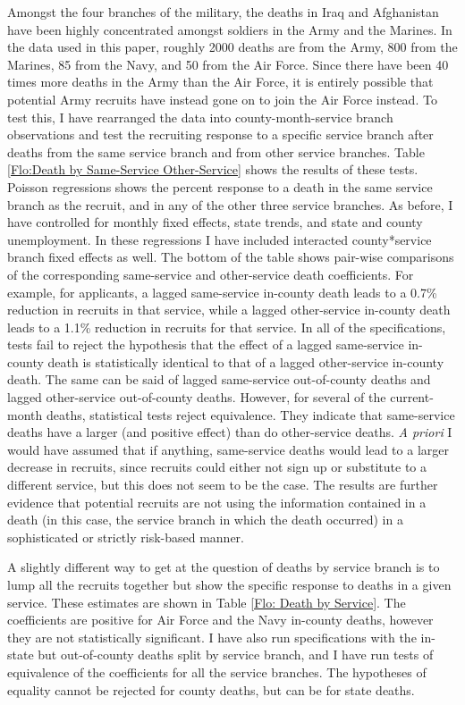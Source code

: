 \documentclass[12pt] {article}
\begin{document}
Amongst the four branches of the military, the deaths in Iraq and
Afghanistan have been highly concentrated amongst soldiers in the
Army and the Marines. In the data used in this paper, roughly 2000
deaths are from the Army, 800 from the Marines, 85 from the Navy,
and 50 from the Air Force. Since there have been 40 times more deaths
in the Army than the Air Force, it is entirely possible that potential
Army recruits have instead gone on to join the Air Force instead.
To test this, I have rearranged the data into county-month-service
branch observations and test the recruiting response to a specific
service branch after deaths from the same service branch and from
other service branches. Table \ref{Flo:Death by Same-Service Other-Service}
shows the results of these tests. Poisson regressions shows the percent
response to a death in the same service branch as the recruit, and
in any of the other three service branches. As before, I have controlled
for monthly fixed effects, state trends, and state and county unemployment.
In these regressions I have included interacted county{*}service branch
fixed effects as well. The bottom of the table shows pair-wise comparisons
of the corresponding same-service and other-service death coefficients.
For example, for applicants, a lagged same-service in-county death
leads to a 0.7\% reduction in recruits in that service, while a lagged
other-service in-county death leads to a 1.1\% reduction in recruits
for that service. In all of the specifications, tests fail to reject
the hypothesis that the effect of a lagged same-service in-county
death is statistically identical to that of a lagged other-service
in-county death. The same can be said of lagged same-service out-of-county
deaths and lagged other-service out-of-county deaths. However, for
several of the current-month deaths, statistical tests reject equivalence.
They indicate that same-service deaths have a larger (and positive
effect) than do other-service deaths. \emph{A priori} I would have
assumed that if anything, same-service deaths would lead to a larger
decrease in recruits, since recruits could either not sign up or substitute
to a different service, but this does not seem to be the case. The
results are further evidence that potential recruits are not using
the information contained in a death (in this case, the service branch
in which the death occurred) in a sophisticated or strictly risk-based
manner.

A slightly different way to get at the question of deaths by service
branch is to lump all the recruits together but show the specific
response to deaths in a given service. These estimates are shown in
Table \ref{Flo: Death by Service}. The coefficients are positive
for Air Force and the Navy in-county deaths, however they are not
statistically significant. I have also run specifications with the
in-state but out-of-county deaths split by service branch, and I have
run tests of equivalence of the coefficients for all the service branches.
The hypotheses of equality cannot be rejected for county deaths, but
can be for state deaths. 
\end{document}

